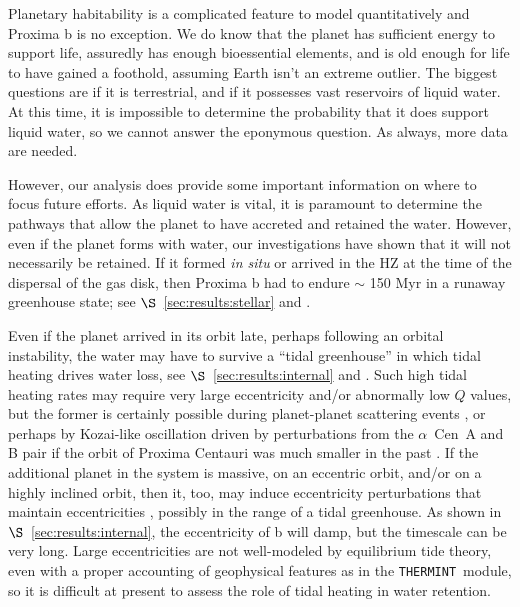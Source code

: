 \documentclass[preprint,12pt]{aastex}
\def\acen{{$\alpha$~Cen}}
\def\thermint{\texttt{\footnotesize{THERMINT}}\xspace}
\begin{document}
Planetary habitability is a complicated feature to model
quantitatively and Proxima b is no exception. We do know that the
planet has sufficient energy to support life, assuredly has enough
bioessential elements, and is old enough for life to have gained a
foothold, assuming Earth isn't an extreme outlier. The biggest
questions are if it is terrestrial, and if it possesses vast reservoirs
of liquid water. At this time, it is impossible to determine the
probability that it does support liquid water, so we cannot answer the
eponymous question. As always, more data are needed.

However, our analysis does provide some important information on where
to focus future efforts. As liquid water is vital, it is paramount to
determine the pathways that allow the planet to have accreted and
retained the water. However, even if the planet forms with water, our
investigations have shown that it will not necessarily be retained. If
it formed {\it in situ} or arrived in the HZ at the time of the
dispersal of the gas disk, then Proxima b had to endure $\sim$ 150
Myr in a runaway greenhouse state; see $\S$~\ref{sec:results:stellar} and
\cite{LugerBarnes15}.

Even if the planet arrived in its orbit late, perhaps following an
orbital instability, the water may have to survive a ``tidal
greenhouse'' in which tidal heating drives water loss, see
$\S$~\ref{sec:results:internal} and \cite{Barnes13}. Such high tidal heating
rates may require very large eccentricity and/or abnormally low $Q$
values, but the former is certainly possible during planet-planet
scattering events \citep{Chatterjee08}, or perhaps by Kozai-like
oscillation driven by perturbations from the \acen~A and B pair if the
orbit of Proxima Centauri was much smaller in the past
\citep{DesideraBarbieri07}. If the additional planet in the system is
massive, on an eccentric orbit, and/or on a highly inclined orbit,
then it, too, may induce eccentricity perturbations that maintain
eccentricities \citep{TakedaRasio05}, possibly in the range of a tidal
greenhouse. As shown in $\S$~\ref{sec:results:internal}, the eccentricity of
b will damp, but the timescale can be very long. Large eccentricities
are not well-modeled by equilibrium tide theory, even with a proper
accounting of geophysical features as in the \thermint~module, so it
is difficult at present to assess the role of tidal heating in water
retention.
\end{document}
